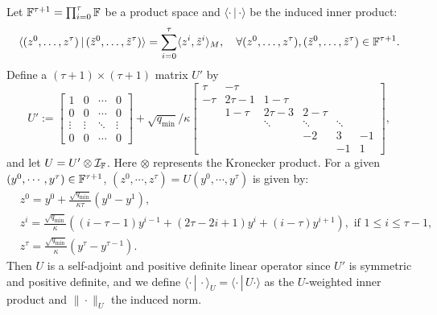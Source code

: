 {Let $\mathbb{F}^{\tau+1}=\prod_{i=0}^{\tau}\mathbb{F}$ be a product space and $\langle\cdot\, |\,\cdot \rangle$ be the induced  inner product:
$$\langle (z^0,\ldots,z^{\tau})\,|\,(\tilde{z}^0,\ldots,\tilde{z}^{\tau})\rangle=\sum_{i=0}^{\tau}\langle z^i,\tilde{z}^i\rangle_M,\quad\forall (z^0,\ldots,z^{\tau}), (\tilde{z}^0,\ldots,\tilde{z}^{\tau})\in\mathbb{F}^{\tau+1}.$$ 
Define a $(\tau+1)\times(\tau+1)$ matrix $U'$ by 
\begin{equation*}%
U':=\begin{bmatrix}1 & 0 & \cdots &0\\
0 & 0 &\cdots & 0\\ \vdots &\vdots & \ddots & \vdots\\
0 & 0 &\cdots & 0 \end{bmatrix}
+\sqrt{q_{\min}}/\kappa\begin{bmatrix} \tau & -\tau &  & \\
-\tau & 2\tau-1 & 1-\tau & \\
 & 1-\tau & 2\tau-3 & 2-\tau  & \\
 & & \ddots & \ddots & \ddots &\\
 & & & -2 & 3  & -1 \\
 & & & &-1 & 1
\end{bmatrix},
\end{equation*}
and let $U=U'\otimes {\mathcal{I}}_{\mathbb{F}}$. Here $\otimes$ represents the Kronecker product. For a given $(y^0,\cdots,y^\tau)\in\mathbb{F}^{\tau+1}$, $(z^0,\cdots,z^\tau)=U(y^0,\cdots,y^\tau)$ is given by:
\begin{align*}
&z^0=\textstyle
y^0+\frac{\sqrt{q_{\min}}}{\kappa\tau} (y^0-y^1),\\
&z^i =
\textstyle\frac{\sqrt{q_{\min}}}{\kappa}((i-\tau-1)y^{i-1}+(2\tau-2i+1)y^i+(i-\tau)y^{i+1}),\text{ if } 1\le i\le \tau-1,\\
&z^{\tau}=\textstyle\frac{\sqrt{q_{\min}}}{\kappa} (y^{\tau}-y^{\tau-1}).
\end{align*} 
Then $U$ is a self-adjoint and positive definite linear operator since $U'$ is
symmetric and positive definite, and we define $\langle\cdot\, |\,
\cdot\rangle_U=\langle\cdot\, |\, U\cdot\rangle$ as the $U$-weighted inner
product and $\|\cdot\|_U$ the induced norm.
 
}
